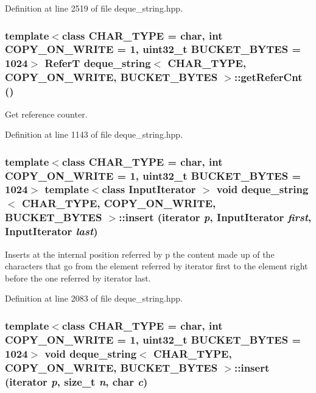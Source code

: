 Definition at line 2519 of file deque\_\-string.hpp.\hypertarget{classdeque__string_fa855547712290b460b7ea219fa085c0}{
\subsubsection[{getReferCnt}]{\setlength{\rightskip}{0pt plus 5cm}template$<$class CHAR\_\-TYPE  = char, int COPY\_\-ON\_\-WRITE = 1, uint32\_\-t BUCKET\_\-BYTES = 1024$>$ ReferT {\bf deque\_\-string}$<$ CHAR\_\-TYPE, COPY\_\-ON\_\-WRITE, BUCKET\_\-BYTES $>$::getReferCnt ()}}
\label{classdeque__string_fa855547712290b460b7ea219fa085c0}


Get reference counter. 

Definition at line 1143 of file deque\_\-string.hpp.\hypertarget{classdeque__string_6aba1bf950849ebc4333fc68398e1c57}{
\subsubsection[{insert}]{\setlength{\rightskip}{0pt plus 5cm}template$<$class CHAR\_\-TYPE  = char, int COPY\_\-ON\_\-WRITE = 1, uint32\_\-t BUCKET\_\-BYTES = 1024$>$ template$<$class InputIterator $>$ void {\bf deque\_\-string}$<$ CHAR\_\-TYPE, COPY\_\-ON\_\-WRITE, BUCKET\_\-BYTES $>$::insert (iterator {\em p}, \/  InputIterator {\em first}, \/  InputIterator {\em last})}}
\label{classdeque__string_6aba1bf950849ebc4333fc68398e1c57}


Inserts at the internal position referred by p the content made up of the characters that go from the element referred by iterator first to the element right before the one referred by iterator last. 

Definition at line 2083 of file deque\_\-string.hpp.\hypertarget{classdeque__string_8cac88fe8224395a9df71f1d95c90d4d}{
\subsubsection[{insert}]{\setlength{\rightskip}{0pt plus 5cm}template$<$class CHAR\_\-TYPE  = char, int COPY\_\-ON\_\-WRITE = 1, uint32\_\-t BUCKET\_\-BYTES = 1024$>$ void {\bf deque\_\-string}$<$ CHAR\_\-TYPE, COPY\_\-ON\_\-WRITE, BUCKET\_\-BYTES $>$::insert (iterator {\em p}, \/  size\_\-t {\em n}, \/  char {\em c})}}
\label{classdeque__string_8cac88fe8224395a9df71f1d95c90d4d}



